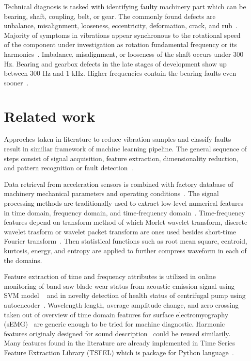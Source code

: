 \documentclass{llncs}
\begin{document}
Technical diagnosis is tasked with identifying faulty machinery part which can be bearing, shaft, coupling, belt, or gear. The commonly found defects are unbalance, misalignment, looseness, eccentricity, deformation, crack, and rub~\cite{mohanty_machinery_2015, scheffer_practical_2004}. Majority of symptoms in vibrations appear synchronous to the rotational speed of the component under investigation as rotation fundamental frequency or its harmonics~\cite{davies_handbook_2012}. Imbalance, misalignment, or looseness of the shaft occurs under 300 Hz. Bearing and gearbox defects in the late stages of development show up between 300 Hz and 1 kHz. Higher frequencies contain the bearing faults even sooner~\cite{torres_automatic_2022}.  



\section{Related work}
Approches taken in literature to reduce vibration samples and classify faults result in similiar framework of machine learning pipeline. The general sequence of steps consist of signal acquisition, feature extraction, dimensionality reduction, and pattern recognition or fault detection~\cite{wang_bearing_2015, brito_fault_2021}. 

Data retrieval from acceleration sensors is combined with factory database of machinery mechanical parameters and operating conditions~\cite{jung_vibration_2017}. The signal processing methods are traditionally used to extract low-level numerical features in time domain, frequency domain, and time-frequency domain~\cite{nandi_condition_2019}. Time-frequency features depend on transform method of which Morlet wavelet transform, discrete wavelet trasform or wavelet packet transform are ones used besides short-time Fourier transform~\cite{maurya_condition-based_2021}. Then statistical functions such as root mean square, centroid, kurtosis, energy, and entropy are applied to further compress
waveform in each of the domains. 

Feature extraction of time and frequency attributes is utilized in online monitoring of band saw blade wear status from acoustic emission signal using SVM model ~\cite{zhuo_research_2022} and in novelty detection of health status of centrifugal pump using autoencoder~\cite{mostafavi_novel_2021}. Wavelength length, average amplitude change, and zero crossing taken out of overview of time domain features for surface electromyography (sEMG)~\cite{moctar_time-domain_2023} are generic enough to be tried for machine diagnostic. Harmonic features originaly designed for sound description~\cite{peeters_large_2004} could be reused similarily. Many features found in the literature are already implemented in Time Series Feature Extraction Library (TSFEL) which is package for Python language~\cite{tsfel}. 
\end{document}
